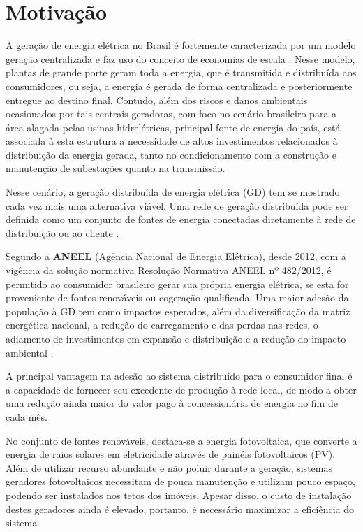 \documentclass[
	12pt,				%
	openany,
	onseside,
	a4paper,			%
	english,			%
	french,				%
	spanish,			%
	brazil,				%
	]{abntex2}
\begin{document}
\section{Motivação}

	A geração de energia elétrica no Brasil é fortemente caracterizada por um modelo geração centralizada e faz uso 
	do conceito de economias de escala \cite{MACHADO2016290}.
	Nesse modelo, plantas de grande porte geram toda a energia, que é transmitida e distribuída aos
	consumidores, ou seja, a energia é gerada de forma centralizada e posteriormente entregue ao destino final.
	Contudo, além dos riscos e danos ambientais ocasionados por tais centrais geradoras, com foco no cenário 
	brasileiro para a área alagada pelas usinas hidrelétricas, principal fonte de energia do país, 
	está associada à esta estrutura a necessidade de altos investimentos relacionados à distribuição da energia 
	gerada, tanto no condicionamento com a construção e manutenção de subestações quanto na transmissão.

	Nesse cenário, a geração distribuída de energia elétrica (GD) tem se mostrado cada vez mais uma alternativa viável.
	Uma rede de geração distribuída pode ser definida como um conjunto de fontes de energia conectadas diretamente 
	à rede de distribuição ou ao cliente \cite{ACKERMANN2001195}.

	Segundo a \textbf{ANEEL} (Agência Nacional de Energia Elétrica), desde 2012, com a vigência da solução normativa
	\href{http://www2.aneel.gov.br/cedoc/ren2012482.pdf}{Resolução Normativa ANEEL nº 482/2012}, é permitido ao 
	consumidor brasileiro gerar sua própria energia elétrica, se esta for proveniente de fontes renováveis ou cogeração qualificada.
	Uma maior adesão da população à GD tem como impactos esperados, além da diversificação da matriz energética nacional, 
	a redução do carregamento e das perdas nas redes, o adiamento de investimentos em expansão e distribuição e a redução 
	do impacto ambiental \cite{ANEEL_GD}.

	A principal vantagem na adesão ao sistema distribuído para o consumidor final é a capacidade de fornecer seu excedente de produção à rede local, de modo a obter uma redução ainda maior do valor pago à concessionária de 
	energia no fim de cada mês.

	No conjunto de fontes renováveis, destaca-se a energia fotovoltaica, que converte a energia de raios solares em eletricidade 
	através de painéis fotovoltaicos (PV). Além de utilizar recurso abundante e não poluir durante a geração, sistemas geradores 
	fotovoltaicos necessitam de pouca manutenção e utilizam pouco espaço, podendo ser instalados nos tetos dos imóveis.
	Apesar disso, o custo de instalação destes geradores ainda é elevado, portanto, é necessário maximizar a eficiência do 
	sistema.
\end{document}
